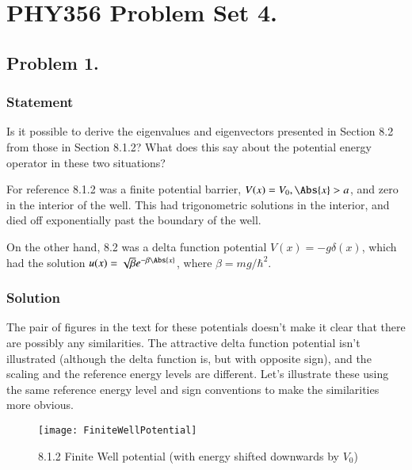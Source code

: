 %
%
%
%
%
%

\chapter{PHY356 Problem Set 4.}
\label{chap:qmIproblemSet4}
{}
\date{Nov 16, 2010}

\beginArtNoToc

\section{Problem 1.}
\subsection{Statement}

Is it possible to derive the eigenvalues and eigenvectors presented in Section 8.2 from those in Section 8.1.2?  What does this say about the potential energy operator in these two situations?

For reference 8.1.2 was a finite potential barrier, $V(x) = V_0, \Abs{x} > a$, and zero in the interior of the well.  This had trigonometric solutions in the interior, and died off exponentially past the boundary of the well.

On the other hand, 8.2 was a delta function potential $V(x) = -g \delta(x)$, which had the solution $u(x) = \sqrt{\beta} e^{-\beta \Abs{x}}$, where $\beta = m g/\hbar^2$.

\subsection{Solution}

The pair of figures in the text \citep{desai2009quantum} for these potentials doesn't make it clear that there are possibly any similarities.  The attractive delta function potential isn't illustrated (although the delta function is, but with opposite sign), and the scaling and the reference energy levels are different.  Let's illustrate these using the same reference energy level and sign conventions to make the similarities more obvious.

\begin{figure}[htp]
\centering
\texttt{[image: FiniteWellPotential]}
\caption{8.1.2 Finite Well potential (with energy shifted downwards by $V_0$)}\label{fig:FiniteWellPotential}
\end{figure}

